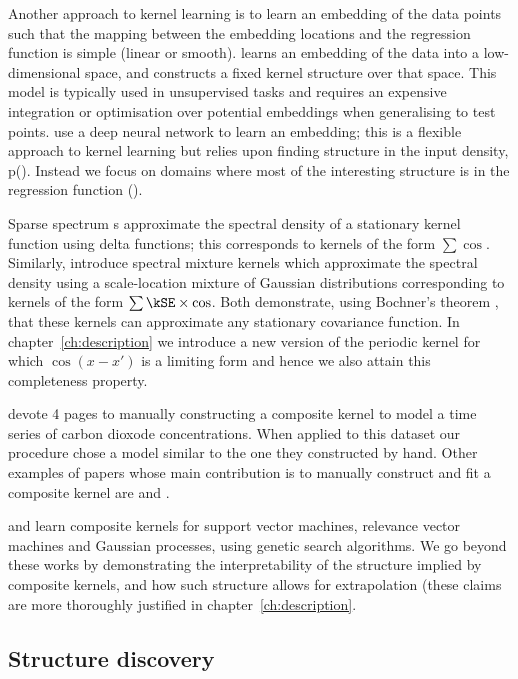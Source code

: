 Another approach to kernel learning is to learn an embedding of the data points such that the mapping between the embedding locations and the regression function is simple (\eg linear or smooth).
\citet{Lawrence2005-cn} learns an embedding of the data into a low-dimensional space, and constructs a fixed kernel structure over that space.
This model is typically used in unsupervised tasks and requires an expensive integration or optimisation over potential embeddings when generalising to test points.
\citet{Salakhutdinov2008-zt} use a deep neural network to learn an embedding; this is a flexible approach to kernel learning but relies upon finding structure in the input density, p().
Instead we focus on domains where most of the interesting structure is in the regression function \function().

Sparse spectrum \gp{}s \citep{Lazaro-gredilla2010-hc} approximate the spectral density of a stationary kernel function using delta functions; this corresponds to kernels of the form $\sum \cos$.
Similarly, \citet{Wilson2013-eq} introduce spectral mixture kernels which approximate the spectral density using a scale-location mixture of Gaussian distributions corresponding to kernels of the form $\sum \kSE \times \cos$.
Both demonstrate, using Bochner's theorem \citep{Bochner1959-yk}, that these kernels can approximate any stationary covariance function.
In chapter~\ref{ch:description} we introduce a new version of the periodic kernel for which $\cos(x-x')$ is a limiting form and hence we also attain this completeness property.

\cite{Rasmussen2006-ml} devote 4 pages to manually constructing a composite kernel to model a time series of carbon dioxode concentrations.
When applied to this dataset our procedure chose a model similar to the one they constructed by hand.
Other examples of papers whose main contribution is to manually construct and fit a composite \gp{} kernel are \cite{Klenske_undated-ys} and \cite{Lloyd2013-yn}.

\citet{Diosan2007-un, Bing2010-of} and \citet{Kronberger_undated-vf} learn composite kernels for support vector machines, relevance vector machines and Gaussian processes, using genetic search algorithms.
We go beyond these works by demonstrating the interpretability of the structure implied by composite kernels, and how such structure allows for extrapolation (these claims are more thoroughly justified in chapter~\ref{ch:description}.

\subsection{Structure discovery}

